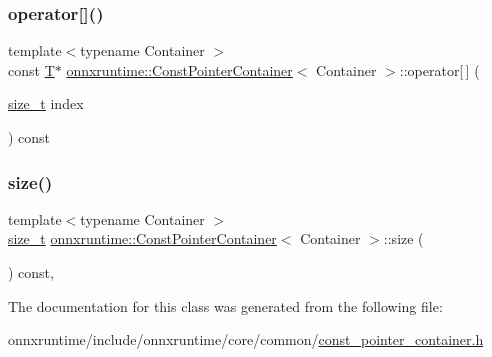 \subsubsection{\texorpdfstring{operator[]()}{operator[]()}}
{\footnotesize\ttfamily template$<$typename Container $>$ \\
const \mbox{\hyperlink{classonnxruntime_1_1ConstPointerContainer_ae78936c3220735b7dba8004b7d5c9888}{T}}$\ast$ \mbox{\hyperlink{classonnxruntime_1_1ConstPointerContainer}{onnxruntime\+::\+Const\+Pointer\+Container}}$<$ Container $>$\+::operator\mbox{[}$\,$\mbox{]} (\begin{DoxyParamCaption}\item[{\mbox{\hyperlink{mlasi_8h_a503efbc1c6e50825320ad909366b78ab}{size\+\_\+t}}}]{index }\end{DoxyParamCaption}) const\hspace{0.3cm}{\ttfamily [inline]}}

\mbox{\label{classonnxruntime_1_1ConstPointerContainer_ad00280a4451d2940c2a92b57a911c8b6}} 
\subsubsection{\texorpdfstring{size()}{size()}}
{\footnotesize\ttfamily template$<$typename Container $>$ \\
\mbox{\hyperlink{mlasi_8h_a503efbc1c6e50825320ad909366b78ab}{size\+\_\+t}} \mbox{\hyperlink{classonnxruntime_1_1ConstPointerContainer}{onnxruntime\+::\+Const\+Pointer\+Container}}$<$ Container $>$\+::size (\begin{DoxyParamCaption}{ }\end{DoxyParamCaption}) const\hspace{0.3cm}{\ttfamily [inline]}, {\ttfamily [noexcept]}}



The documentation for this class was generated from the following file\+:\begin{DoxyCompactItemize}
\item 
onnxruntime/include/onnxruntime/core/common/\mbox{\hyperlink{const__pointer__container_8h}{const\+\_\+pointer\+\_\+container.\+h}}\end{DoxyCompactItemize}
